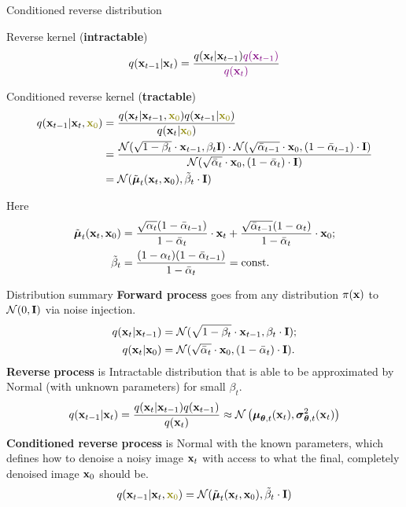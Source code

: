 \begin{frame}{Conditioned reverse distribution}
	\begin{block}{Reverse kernel (\textbf{intractable})}
		\vspace{-0.3cm}
		\[
			q(\mathbf{x}_{t-1}|\mathbf{x}_{t}) = \frac{q(\mathbf{x}_{t}|\mathbf{x}_{t-1}) {\color{violet}q(\mathbf{x}_{t-1})}}{{\color{violet}q(\mathbf{x}_{t})}} 
		\]
		\vspace{-0.5cm}
	\end{block}
	\begin{block}{Conditioned reverse kernel (\textbf{tractable})}
		\vspace{-0.6cm}
		\begin{align*}
			q(\bx_{t-1}|\bx_{t}, {\color{olive}\bx_0}) & = \frac{q(\bx_{t}|\bx_{t-1}, {\color{olive}\bx_0}) q(\bx_{t-1} | {\color{olive}\bx_0}) }{q(\bx_{t}| {\color{olive}\bx_0})} \\
			& = \frac{\cN(\sqrt{1 - \beta_t} \cdot \bx_{t-1}, \beta_t \bI) \cdot \cN(\sqrt{\bar{\alpha}_{t-1}} \cdot \bx_0, (1 - \bar{\alpha}_{t-1}) \cdot \bI)}{ \cN(\sqrt{\bar{\alpha}_t} \cdot \bx_0, (1 - \bar{\alpha}_t) \cdot \bI)} \\
			&= \cN(\tilde{\bmu}_t(\bx_t, \bx_0), \tilde{\beta}_t \cdot \bI)
		\end{align*}
		\vspace{-0.7cm}
	\end{block}
	Here 
	\begin{align*}
		\tilde{\boldsymbol{\mu}}_t(\mathbf{x}_t, \mathbf{x}_0) &= \frac{\sqrt{\alpha_t}(1 - \bar{\alpha}_{t-1})}{1 - \bar{\alpha}_t} \cdot \mathbf{x}_t + \frac{\sqrt{\bar{\alpha}_{t-1}}(1 - \alpha_t)}{1 - \bar{\alpha}_t} \cdot \mathbf{x}_0; \\
		\tilde{\beta}_t &= \frac{(1 - \alpha_t)(1 - \bar{\alpha}_{t-1})}{1 - \bar{\alpha}_t} = \text{const}.
	\end{align*}
\end{frame}
\begin{frame}{Distribution summary}
	\textbf{Forward process} goes from any distribution $\pi(\mathbf{x})$ to $\mathcal{N}(0, \mathbf{I})$ via noise injection.
	\begin{align*}
		q(\mathbf{x}_t | \mathbf{x}_{t-1}) &= \mathcal{N}(\sqrt{1 - \beta_t} \cdot \mathbf{x}_{t-1}, \beta_t \cdot \mathbf{I}); \\
		q(\mathbf{x}_t | \mathbf{x}_0) &= \mathcal{N}(\sqrt{\bar{\alpha}_t} \cdot \mathbf{x}_0, (1 - \bar{\alpha}_t) \cdot \mathbf{I}).
	\end{align*}
	\textbf{Reverse process} is Intractable distribution that is able to be approximated by Normal (with unknown parameters) for small $\beta_t$.
	\[
		q(\mathbf{x}_{t-1}|\mathbf{x}_{t}) = \frac{q(\mathbf{x}_{t}|\mathbf{x}_{t-1}) q(\mathbf{x}_{t-1})}{q(\mathbf{x}_{t})} \approx \mathcal{N} \left(\boldsymbol{\mu}_{\boldsymbol{\theta}, t}(\mathbf{x}_t), \boldsymbol{\sigma}_{\boldsymbol{\theta}, t}^2(\mathbf{x}_t)\right)
	\]
	\textbf{Conditioned reverse process} is Normal with the known parameters, which defines how to denoise a noisy image $\mathbf{x}_t$ with access to what the final, completely denoised image $\mathbf{x}_0$ should be.
	\[
		q(\bx_{t-1}|\bx_{t}, {\color{olive}\bx_0}) = \cN(\tilde{\bmu}_t(\bx_t, \bx_0), \tilde{\beta}_t \cdot \bI)
	\]
\end{frame}
